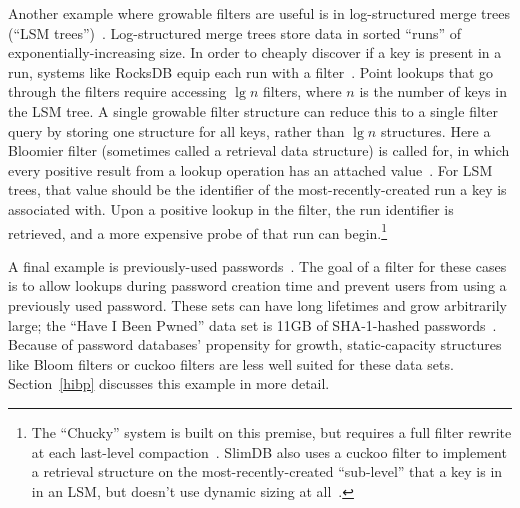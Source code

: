 \documentclass[letterpaper,twocolumn,10pt]{article}
\begin{document}

Another example where growable filters are useful is in log-structured merge trees (``LSM trees'')~\cite{lsm}.
Log-structured merge trees store data in sorted ``runs'' of exponentially-increasing size.
In order to cheaply discover if a key is present in a run, systems like RocksDB equip each run with a filter~\cite{lsm, ribbon}.
Point lookups that go through the filters require accessing $\lg n$ filters, where $n$ is the number of keys in the LSM tree.
A single growable filter structure can reduce this to a single filter query by storing one structure for all keys, rather than $\lg n$ structures.
Here a Bloomier filter (sometimes called a retrieval data structure) is called for, in which every positive result from a lookup operation has an attached value~\cite{bloomier}.
For LSM trees, that value should be the identifier of the most-recently-created run a key is associated with.
Upon a positive lookup in the filter, the run identifier is retrieved, and a more expensive probe of that run can begin.\footnote{
The ``Chucky'' system is built on this premise, but requires a full filter rewrite at each last-level compaction~\cite{chucky}.
SlimDB also uses a cuckoo filter to implement a retrieval structure on the most-recently-created ``sub-level'' that a key is in in an LSM, but doesn't use dynamic sizing at all~\cite{slim}.
}

A final example is previously-used passwords~\cite{opus}.
The goal of a filter for these cases is to allow lookups during password creation time and prevent users from using a previously used password.
These sets can have long lifetimes and grow arbitrarily large; the ``Have I Been Pwned'' data set is 11GB of SHA-1-hashed passwords~\cite{pwned}.
Because of password databases' propensity for growth, static-capacity structures like Bloom filters or cuckoo filters are less well suited for these data sets.
Section~\ref{hibp} discusses this example in more detail.
\end{document}
